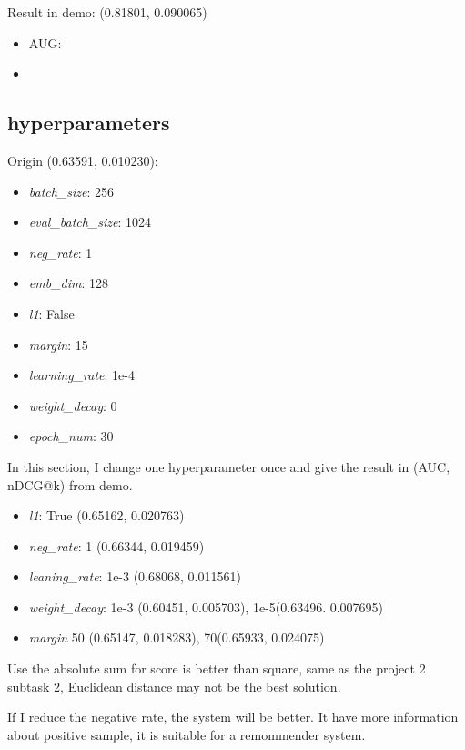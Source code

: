\documentclass[lettersize,journal]{IEEEtran}
\begin{document}
Result in demo: (0.81801, 0.090065)

\begin{itemize}
    \item AUG:
    \item 
\end{itemize}

\subsection{hyperparameters}

Origin (0.63591, 0.010230):

\begin{itemize}
    \item \textit{batch\_size}: 256
    \item \textit{eval\_batch\_size}: 1024
    \item \textit{neg\_rate}: 1
    \item \textit{emb\_dim}: 128
    \item \textit{l1}: False
    \item \textit{margin}: 15
    \item \textit{learning\_rate}: 1e-4
    \item \textit{weight\_decay}: 0
    \item \textit{epoch\_num}: 30
\end{itemize}

In this section, I change one hyperparameter once and give the result in (AUC, nDCG@k) from demo.

\begin{itemize}
    \item \textit{l1}: True (0.65162, 0.020763)
    \item \textit{neg\_rate}: 1 (0.66344, 0.019459)
    \item \textit{leaning\_rate}: 1e-3 (0.68068, 0.011561)
    \item \textit{weight\_decay}: 1e-3 (0.60451, 0.005703),  1e-5(0.63496. 0.007695)
    \item \textit{margin} 50 (0.65147, 0.018283), 70(0.65933, 0.024075)
\end{itemize}

Use the absolute sum for score is better than square, same as the project 2 subtask 2, Euclidean distance may not be the best solution.

If I reduce the negative rate, the system will be better. It have more information about positive sample, it is suitable for a remommender system.
\end{document}
